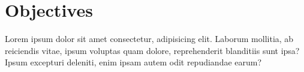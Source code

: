 \section{Objectives}

Lorem ipsum dolor sit amet consectetur, adipisicing elit. Laborum mollitia, ab
reiciendis vitae, ipsum voluptas quam dolore, reprehenderit blanditiis sunt
ipsa? Ipsum excepturi deleniti, enim ipsam autem odit repudiandae earum?